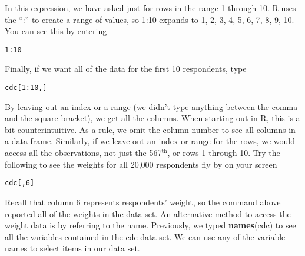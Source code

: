\documentclass{article}\usepackage[]{graphicx}\usepackage[]{color}
\makeatletter
\newcommand{\hlnum}[1]{\textcolor[rgb]{0.686,0.059,0.569}{#1}}%
\newcommand{\hlopt}[1]{\textcolor[rgb]{0,0,0}{#1}}%
\newcommand{\hlstd}[1]{\textcolor[rgb]{0.345,0.345,0.345}{#1}}%
\newcommand{\hlkwd}[1]{\textcolor[rgb]{0.737,0.353,0.396}{\textbf{#1}}}%
\newenvironment{kframe}{%
 \def\at@end@of@kframe{}%
 \ifinner\ifhmode%
  \def\at@end@of@kframe{\end{minipage}}%
  \begin{minipage}{\columnwidth}%
 \fi\fi%
 \def\FrameCommand##1{\hskip\@totalleftmargin \hskip-\fboxsep
 \colorbox{shadecolor}{##1}\hskip-\fboxsep
     \hskip-\linewidth \hskip-\@totalleftmargin \hskip\columnwidth}%
 \MakeFramed {\advance\hsize-\width
   \@totalleftmargin\z@ \linewidth\hsize
   \@setminipage}}%
 {\par\unskip\endMakeFramed%
 \at@end@of@kframe}
\newenvironment{knitrout}{}{} %
\makeatother
\begin{document}
In this expression, we have asked just for rows in the range 1 through 10.  R uses the ``:'' to create a range of values, so 1:10 expands to 1, 2, 3, 4, 5, 6, 7, 8, 9, 10. You can see this by entering

\begin{knitrout}
\color{fgcolor}\begin{kframe}
\begin{alltt}
\hlnum{1}\hlopt{:}\hlnum{10}
\end{alltt}
\end{kframe}
\end{knitrout}

Finally, if we want all of the data for the first 10 respondents, type

\begin{knitrout}
\color{fgcolor}\begin{kframe}
\begin{alltt}
\hlstd{cdc[}\hlnum{1}\hlopt{:}\hlnum{10}\hlstd{,]}
\end{alltt}
\end{kframe}
\end{knitrout}

By leaving out an index or a range (we didn't type anything between the comma and the square bracket), we get all the columns. When starting out in R, this is a bit counterintuitive. As a rule, we omit the column number to see all columns in a data frame. Similarly, if we leave out an index or range for the rows, we would access all the observations, not just the 567$^{\textrm{th}}$, or rows 1 through 10. Try the following to see the weights for all 20,000 respondents fly by on your screen

\begin{knitrout}
\color{fgcolor}\begin{kframe}
\begin{alltt}
\hlstd{cdc[,}\hlnum{6}\hlstd{]}
\end{alltt}
\end{kframe}
\end{knitrout}

Recall that column 6 represents respondents' weight, so the command above reported all of the weights in the data set. An alternative method to access the weight data is by referring to the name.  Previously, we typed \hlkwd{names}\hlstd{(}\hlstd{cdc}\hlstd{)} to see all the variables contained in the cdc data set. We can use any of the variable names to select items in our data set. 
\end{document}
